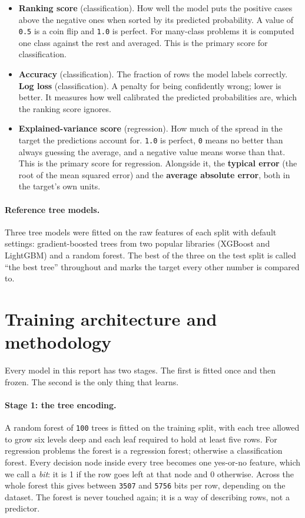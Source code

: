 \documentclass[11pt,a4paper]{article}
\newcommand{\num}[1]{\texttt{#1}}
\begin{document}
\begin{itemize}
  \item \textbf{Ranking score} (classification). How well the model puts the
        positive cases above the negative ones when sorted by its predicted
        probability. A value of \num{0.5} is a coin flip and \num{1.0} is
        perfect. For many-class problems it is computed one class against the
        rest and averaged. This is the primary score for classification.
  \item \textbf{Accuracy} (classification). The fraction of rows the model
        labels correctly. \textbf{Log loss} (classification). A penalty for
        being confidently wrong; lower is better. It measures how well
        calibrated the predicted probabilities are, which the ranking score
        ignores.
  \item \textbf{Explained-variance score} (regression). How much of the spread
        in the target the predictions account for. \num{1.0} is perfect,
        \num{0} means no better than always guessing the average, and a negative
        value means worse than that. This is the primary score for regression.
        Alongside it, the \textbf{typical error} (the root of the mean squared
        error) and the \textbf{average absolute error}, both in the target's
        own units.
\end{itemize}

\paragraph{Reference tree models.} Three tree models were fitted on the raw
features of each split with default settings: gradient-boosted trees from two
popular libraries (XGBoost and LightGBM) and a random forest. The best of the
three on the test split is called ``the best tree'' throughout and marks the
target every other number is compared to.

\section{Training architecture and methodology}

Every model in this report has two stages. The first is fitted once and then
frozen. The second is the only thing that learns.

\paragraph{Stage 1: the tree encoding.} A random forest of \num{100} trees is
fitted on the training split, with each tree allowed to grow six levels deep
and each leaf required to hold at least five rows. For regression problems the
forest is a regression forest; otherwise a classification forest. Every
decision node inside every tree becomes one yes-or-no feature, which we call a
\emph{bit}: it is 1 if the row goes left at that node and 0 otherwise. Across
the whole forest this gives between \num{3507} and \num{5756} bits per row,
depending on the dataset. The forest is never touched again; it is a way of
describing rows, not a predictor.
\end{document}
